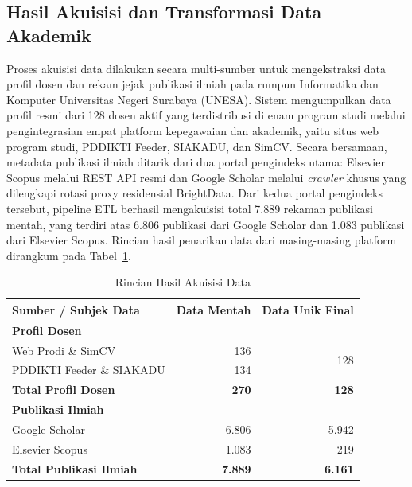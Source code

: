 \documentclass{rapidsart}
\theoremstyle{plain}
\theoremstyle{remark}
\theoremstyle{definition}
\begin{document}
\begin{sloppypar}

    \subsection{Hasil Akuisisi dan Transformasi Data Akademik}
    Proses akuisisi data dilakukan secara multi-sumber untuk mengekstraksi data profil dosen dan rekam jejak publikasi ilmiah pada rumpun Informatika dan Komputer Universitas Negeri Surabaya (UNESA). Sistem mengumpulkan data profil resmi dari 128 dosen aktif yang terdistribusi di enam program studi melalui pengintegrasian empat platform kepegawaian dan akademik, yaitu situs web program studi, PDDIKTI Feeder, SIAKADU, dan SimCV. Secara bersamaan, metadata publikasi ilmiah ditarik dari dua portal pengindeks utama: Elsevier Scopus melalui REST API resmi dan Google Scholar melalui \textit{crawler} khusus yang dilengkapi rotasi proxy residensial BrightData. Dari kedua portal pengindeks tersebut, pipeline ETL berhasil mengakuisisi total 7.889 rekaman publikasi mentah, yang terdiri atas 6.806 publikasi dari Google Scholar dan 1.083 publikasi dari Elsevier Scopus. Rincian hasil penarikan data dari masing-masing platform dirangkum pada Tabel~\ref{tab:statistik-akuisisi}.

    \begin{table}[htbp]
        \caption{Rincian Hasil Akuisisi Data}
        \label{tab:statistik-akuisisi}
        \centering
        \begin{tabular}{lrr}
            \toprule
            \textbf{Sumber / Subjek Data}   & \textbf{Data Mentah} & \textbf{Data Unik Final} \\
            \midrule
            \textbf{Profil Dosen}           &                      &                          \\
            Web Prodi \& SimCV              & 136                  & \multirow{2}{*}{128}     \\
            PDDIKTI Feeder \& SIAKADU       & 134                  &                          \\
            \textbf{Total Profil Dosen}     & \textbf{270}         & \textbf{128}             \\
            \midrule
            \textbf{Publikasi Ilmiah}       &                      &                          \\
            Google Scholar                  & 6.806                & 5.942                    \\
            Elsevier Scopus                 & 1.083                & 219                      \\
            \textbf{Total Publikasi Ilmiah} & \textbf{7.889}       & \textbf{6.161}           \\
            \bottomrule
        \end{tabular}
    \end{table}


\end{sloppypar}
\end{document}
